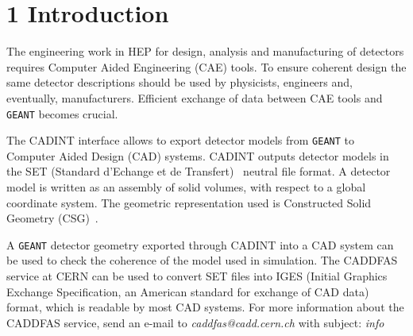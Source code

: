  
 
 
 
         
         
 
 
\section*{1 Introduction}
 
The engineering work in HEP for design,
analysis and manufacturing of detectors
requires Computer Aided Engineering (CAE) tools.
To ensure coherent design the same detector descriptions should
be used by physicists, engineers and, eventually, manufacturers. Efficient
exchange of data between CAE tools and
{\tt GEANT} becomes crucial.
 
 
The CADINT interface allows to export detector models from {\tt GEANT}
to Computer Aided Design (CAD) systems.
CADINT outputs detector models in the SET (Standard d'Echange
et de Transfert)~\cite{set} neutral file format.
A detector model is written as an assembly
of solid volumes, with respect to a global coordinate system. The geometric
representation used is
Constructed Solid Geometry (CSG)~\cite{mortenson}.
 
A {\tt GEANT} detector geometry exported through CADINT
into a CAD system can be used to
check the coherence of the model used in simulation.
The CADDFAS service at CERN can be used to convert SET files into IGES
(Initial Graphics Exchange Specification, an American
standard for exchange of CAD data)~\cite{iges} format, which is readable
by most CAD systems.
For more information about the CADDFAS service, send an e-mail to {\it
caddfas@cadd.cern.ch} with subject: {\it info}
 
 
 
 
 
